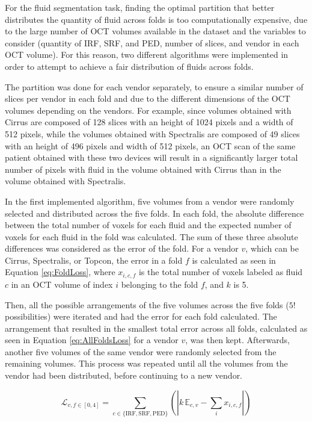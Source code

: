 For the fluid segmentation task, finding the optimal partition that better distributes the quantity of fluid across folds is too computationally expensive, due to the large number of OCT volumes available in the dataset and the variables to consider (quantity of IRF, SRF, and PED, number of slices, and vendor in each OCT volume). For this reason, two different algorithms were implemented in order to attempt to achieve a fair distribution of fluids across folds. 
\par
The partition was done for each vendor separately, to ensure a similar number of slices per vendor in each fold and due to the different dimensions of the OCT volumes depending on the vendors. For example, since volumes obtained with Cirrus are composed of 128 slices with an height of 1024 pixels and a width of 512 pixels, while the volumes obtained with Spectralis are composed of 49 slices with an height of 496 pixels and width of 512 pixels, an OCT scan of the same patient obtained with these two devices will result in a significantly larger total number of pixels with fluid in the volume obtained with Cirrus than in the volume obtained with Spectralis.
\par
In the first implemented algorithm, five volumes from a vendor were randomly selected and distributed across the five folds. In each fold, the absolute difference between the total number of voxels for each fluid and the expected number of voxels for each fluid in the fold was calculated. The sum of these three absolute differences was considered as the error of the fold. For a vendor $v$, which can be Cirrus, Spectralis, or Topcon, the error in a fold $f$ is calculated as seen in Equation \ref{eq:FoldLoss}, where $x_{i,c,f}$ is the total number of voxels labeled as fluid $c$ in an OCT volume of index $i$ belonging to the fold $f$, and $k$ is 5.
\par
Then, all the possible arrangements of the five volumes across the five folds ($5!$ possibilities) were iterated and had the error for each fold calculated. The arrangement that resulted in the smallest total error across all folds, calculated as seen in Equation \ref{eq:AllFoldsLoss} for a vendor $v$, was then kept. Afterwards, another five volumes of the same vendor were randomly selected from the remaining volumes. This process was repeated until all the volumes from the vendor had been distributed, before continuing to a new vendor.

\begin{equation}
	\mathcal{L}_{v, f \in [0,4]} = \sum_{c \in \{\mathrm{IRF}, \mathrm{SRF}, \mathrm{PED}\}} \left( 
	| k\, \mathbb{E}_{c,v} - \sum_{i} x_{i,c,f} |
	\right)
	\label{eq:FoldLoss}
\end{equation}

